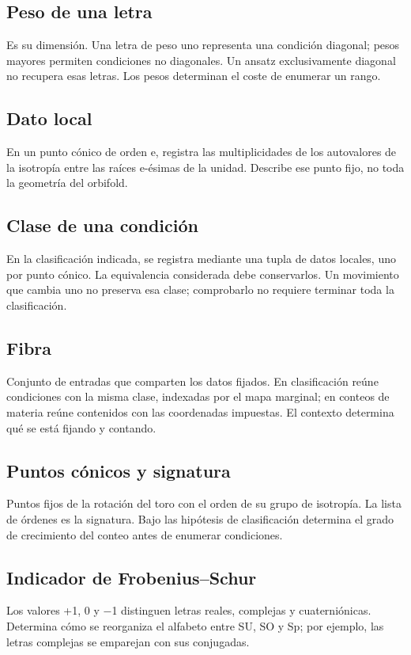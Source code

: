 \documentclass[11pt,a4paper]{article}
\begin{document}
\subsection*{Peso de una letra}
Es su dimensión. Una letra de peso uno representa una condición diagonal; pesos mayores permiten condiciones no diagonales. Un ansatz exclusivamente diagonal no recupera esas letras. Los pesos determinan el coste de enumerar un rango.

\subsection*{Dato local}
En un punto cónico de orden e, registra las multiplicidades de los autovalores de la isotropía entre las raíces e-ésimas de la unidad. Describe ese punto fijo, no toda la geometría del orbifold.

\subsection*{Clase de una condición}
En la clasificación indicada, se registra mediante una tupla de datos locales, uno por punto cónico. La equivalencia considerada debe conservarlos. Un movimiento que cambia uno no preserva esa clase; comprobarlo no requiere terminar toda la clasificación.

\subsection*{Fibra}
Conjunto de entradas que comparten los datos fijados. En clasificación reúne condiciones con la misma clase, indexadas por el mapa marginal; en conteos de materia reúne contenidos con las coordenadas impuestas. El contexto determina qué se está fijando y contando.

\subsection*{Puntos cónicos y signatura}
Puntos fijos de la rotación del toro con el orden de su grupo de isotropía. La lista de órdenes es la signatura. Bajo las hipótesis de clasificación determina el grado de crecimiento del conteo antes de enumerar condiciones.

\subsection*{Indicador de Frobenius--Schur}
Los valores +1, 0 y \ensuremath{-}1 distinguen letras reales, complejas y cuaterniónicas. Determina cómo se reorganiza el alfabeto entre SU, SO y Sp; por ejemplo, las letras complejas se emparejan con sus conjugadas.
\end{document}

